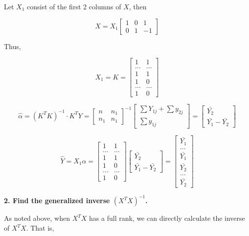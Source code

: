 \documentclass[]{book}
\begin{document}
Let \(X_1\) consist of the first 2 columns of \(X\), then

\[X=X_1 \begin{bmatrix}
1 & 0 & 1 \\ 0 & 1 & -1 \end{bmatrix}\]

Thus,

\[X_1=K=\begin{bmatrix}
1 & 1 \\
... & ...  \\
1 & 1 \\
1 & 0  \\ 
... & ... \\
1 & 0  \end{bmatrix} \]

\[\hat{\alpha}=(K^T K)^{-1} \cdot K^TY=\begin{bmatrix}
n & n_1 \\
n_1 & n_1 \end{bmatrix}^{-1} \begin{bmatrix}
\sum Y_{1j}+\sum y_{2j} \\
\sum y_{1j} \end{bmatrix} =\begin{bmatrix}
\bar{Y_2}\\ \bar{Y_1}-\bar{Y_2} \end{bmatrix}\]

\[\hat{Y}=X_1 \hat{\alpha}=\begin{bmatrix}
1 & 1 \\
... & ...  \\
1 & 1 \\
1 & 0  \\ 
... & ... \\
1 & 0  \end{bmatrix} \begin{bmatrix}
\bar{Y_2}\\ \bar{Y_1}-\bar{Y_2} \end{bmatrix}=\begin{bmatrix}
\bar{Y_1}  \\
...   \\
\bar{Y_1} \\
\bar{Y_2}   \\ 
... \\
\bar{Y_2} \end{bmatrix}\]

\textbf{2. Find the generalized inverse \((X^TX)^{-1}\). }

As noted above, when \(X^TX\) has a full rank, we can directly calculate the inverse of \(X^TX\). That is,
\end{document}
